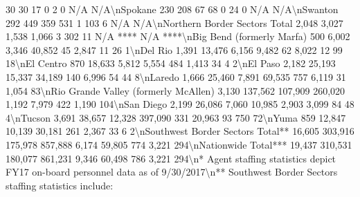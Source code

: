 \documentclass[
]{krantz}
\makeatletter
\newenvironment{Shaded}{\begin{snugshade}}{\end{snugshade}}
\newenvironment{kframe}{%
\medskip{}
\setlength{\fboxsep}{.8em}
 \def\at@end@of@kframe{}%
 \ifinner\ifhmode%
  \def\at@end@of@kframe{\end{minipage}}%
  \begin{minipage}{\columnwidth}%
 \fi\fi%
 \def\FrameCommand##1{\hskip\@totalleftmargin \hskip-\fboxsep
 \colorbox{shadecolor}{##1}\hskip-\fboxsep
     \hskip-\linewidth \hskip-\@totalleftmargin \hskip\columnwidth}%
 \MakeFramed {\advance\hsize-\width
   \@totalleftmargin\z@ \linewidth\hsize
   \@setminipage}}%
 {\par\unskip\endMakeFramed%
 \at@end@of@kframe}
\renewenvironment{Shaded}{\begin{kframe}}{\end{kframe}}
\makeatother
\begin{document}
\begin{Shaded}
\begin{Highlighting}[]
            30                        30                     17                 0                2               0              N/A      N/A\textbackslash{}nSpokane                                           230                208                       67                     68                 0               24               0              N/A      N/A\textbackslash{}nSwanton                                           292               449                       359                    531                 1               103               6             N/A      N/A\textbackslash{}nNorthern Border Sectors Total                    2,048             3,027                     1,538                  1,066                3               302              11        N/A ****    N/A   ****\textbackslash{}nBig Bend (formerly Marfa)                         500              6,002                     3,346                  40,852              45              2,847             11             26       1\textbackslash{}nDel Rio                                          1,391             13,476                    6,156                  9,482               62              8,022             12             99       18\textbackslash{}nEl Centro                                         870              18,633                    5,812                  5,554              484              1,413             34             4        2\textbackslash{}nEl Paso                                          2,182             25,193                   15,337                  34,189             140              6,996             54             44       8\textbackslash{}nLaredo                                           1,666             25,460                    7,891                  69,535             757              6,119             31            1,054     83\textbackslash{}nRio Grande Valley (formerly McAllen)             3,130            137,562                  107,909                 260,020            1,192             7,979            422            1,190    104\textbackslash{}nSan Diego                                        2,199             26,086                    7,060                  10,985            2,903             3,099             84             48       4\textbackslash{}nTucson                                           3,691             38,657                   12,328                 397,090             331             20,963             93            750       72\textbackslash{}nYuma                                              859              12,847                   10,139                  30,181             261              2,367             33             6        2\textbackslash{}nSouthwest Border Sectors Total**                16,605            303,916                  175,978                 857,888            6,174            59,805            774            3,221    294\textbackslash{}nNationwide Total***                             19,437            310,531                  180,077                 861,231            9,346            60,498            786            3,221    294\textbackslash{}n* Agent staffing statistics depict FY17 on{-}board personnel data as of 9/30/2017\textbackslash{}n** Southwest Border Sectors staffing statistics include: 
\end{Highlighting}
\end{Shaded}
\end{document}
